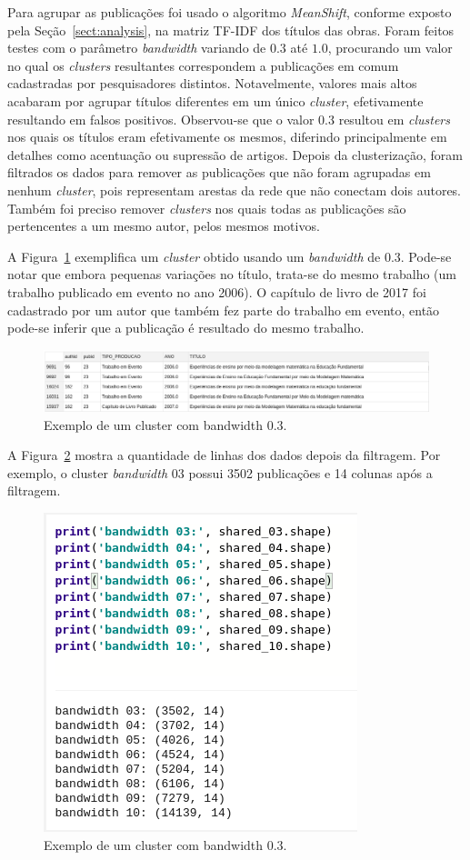 \documentclass[12pt]{article}
\begin{document}
Para agrupar as publicações foi usado o algoritmo \textit{MeanShift}, conforme exposto pela Seção~\ref{sect:analysis}, na matriz TF-IDF dos títulos das obras. Foram feitos testes com o parâmetro \textit{bandwidth} variando de $0.3$ até $1.0$, procurando um valor no qual os \textit{clusters} resultantes correspondem a publicações em comum cadastradas por pesquisadores distintos. Notavelmente, valores mais altos acabaram por agrupar títulos diferentes em um único \textit{cluster}, efetivamente resultando em falsos positivos. Observou-se que o valor $0.3$ resultou em \textit{clusters} nos quais os títulos eram efetivamente os mesmos, diferindo principalmente em detalhes como acentuação ou supressão de artigos. Depois da clusterização, foram filtrados os dados para remover as publicações que não foram agrupadas em nenhum \textit{cluster}, pois representam arestas da rede que não conectam dois autores. Também foi preciso remover \textit{clusters} nos quais todas as publicações são pertencentes a um mesmo autor, pelos mesmos motivos.

A Figura~\ref{fig:cluster03} exemplifica um \textit{cluster} obtido usando um \textit{bandwidth} de $0.3$. Pode-se notar que embora pequenas variações no título, trata-se do mesmo trabalho (um trabalho publicado em evento no ano 2006). O capítulo de livro de 2017 foi cadastrado por um autor que também fez parte do trabalho em evento, então pode-se inferir que a publicação é resultado do mesmo trabalho.

\begin{figure}[ht]
\centering
  \includegraphics[width=1\textwidth]{shared-03-cluster.png}
  \caption{Exemplo de um cluster com bandwidth 0.3.}
  \label{fig:cluster03}
\end{figure}

A Figura~\ref{fig:numeroCluster} mostra a quantidade de linhas dos dados depois da filtragem. Por exemplo, o cluster \textit{bandwidth} $03$ possui 3502 publicações e 14 colunas após a filtragem.

\begin{figure}[ht]
\centering
  \includegraphics[width=.45\textwidth]{shared-size.png}
  \caption{Exemplo de um cluster com bandwidth 0.3.}
  \label{fig:numeroCluster}
\end{figure}
\end{document}
